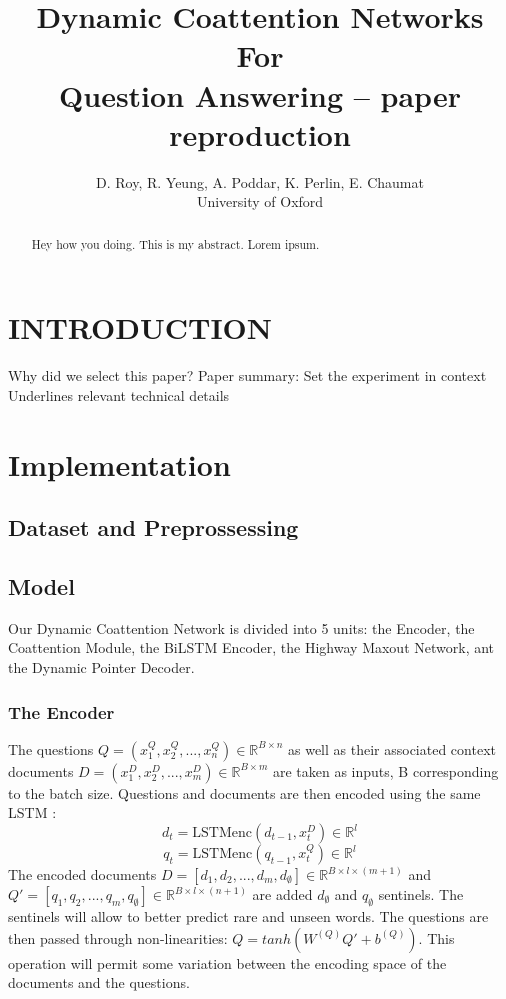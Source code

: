 \documentclass[letterpaper, 10 pt, conference]{ieeeconf}  %
\title{\LARGE \bf
Dynamic Coattention Networks For \\Question Answering -- paper reproduction
}
\author{D. Roy, R. Yeung, A. Poddar, K. Perlin, E. Chaumat
\\University of Oxford}%
\newcommand{\LSTMenc}{\text{LSTMenc}}
\renewcommand{\Re}{\mathbb{R}}
\begin{document}
\maketitle
\thispagestyle{empty}
\pagestyle{empty}



\begin{abstract}

Hey how you doing. This is my abstract. Lorem ipsum.

\end{abstract}


\section{INTRODUCTION}

Why did we select this paper?
Paper summary: 
	Set the experiment in context
	Underlines relevant technical details



\section{Implementation}
\subsection{Dataset and Preprossessing}
\subsection{Model}
Our Dynamic Coattention Network is divided into 5 units: the Encoder, the Coattention Module, the BiLSTM Encoder, the Highway Maxout Network, ant the Dynamic Pointer Decoder.\\
\subsubsection{The Encoder}


The questions $Q=(x_1^Q,x_2^Q,...,x_n^Q)\in\Re^{B \times n}$  as well as their associated context documents $D=(x_1^D,x_2^D,...,x_m^D)\in\Re^{B\times m}$ are taken as inputs, B corresponding to the batch size.  
Questions and documents are then encoded using the same LSTM : 
\begin{equation}
d_t= \LSTMenc(d_{t-1},x_t^D)\in\Re^{l} 
\end{equation}
\begin{equation}
q_t= \LSTMenc(q_{t-1},x_t^Q)\in\Re^{l}
\end{equation}
The encoded documents $D=[d_1,d_2,...,d_m,d_{\emptyset}]\in\Re^{B \times l \times (m+1)}$ and  $Q'=[q_1,q_2,...,q_m,q_{\emptyset}]\in\Re^{B \times l \times (n+1)} $ are added $d_{\emptyset}$ and $q_{\emptyset}$ sentinels. The sentinels will allow to better predict rare and unseen words.
The questions are then passed through non-linearities: $Q=tanh(W^{(Q)}Q'+b^{(Q)})$. This operation will permit some variation between the encoding space of the documents and the questions.\\
 
\end{document}
